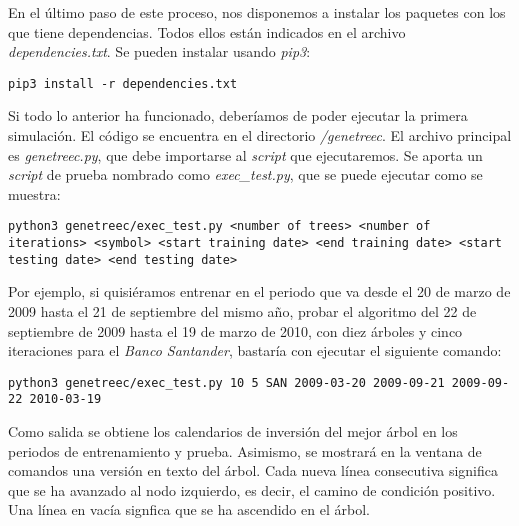 \begin{appendices}
En el \'ultimo paso de este proceso, nos disponemos a instalar los paquetes con los que tiene dependencias. Todos ellos est\'an indicados en el archivo \textit{dependencies.txt}. Se pueden instalar usando \textit{pip3}:

\begin{lstlisting}[basicstyle=\small]
pip3 install -r dependencies.txt
\end{lstlisting}

Si todo lo anterior ha funcionado, deber\'iamos de poder ejecutar la primera simulaci\'on. El c\'odigo se encuentra en el directorio \textit{/genetreec}. El archivo principal es \textit{genetreec.py}, que debe importarse al \textit{script} que ejecutaremos. Se aporta un \textit{script} de prueba nombrado como \textit{exec\_test.py}, que se puede ejecutar como se muestra:

\begin{lstlisting}[basicstyle=\small]
python3 genetreec/exec_test.py <number of trees> <number of iterations> <symbol> <start training date> <end training date> <start testing date> <end testing date>
\end{lstlisting}

Por ejemplo, si quisi\'eramos entrenar en el periodo que va desde el 20 de marzo de 2009 hasta el 21 de septiembre del mismo a\~no, probar el algoritmo del 22 de septiembre de 2009 hasta el 19 de marzo de 2010, con diez \'arboles y cinco iteraciones para el \textit{Banco Santander}, bastar\'ia con ejecutar el siguiente comando:

\begin{lstlisting}[basicstyle=\small]
python3 genetreec/exec_test.py 10 5 SAN 2009-03-20 2009-09-21 2009-09-22 2010-03-19
\end{lstlisting}

Como salida se obtiene los calendarios de inversi\'on del mejor \'arbol en los periodos de entrenamiento y prueba. Asimismo, se mostrar\'a en la ventana de comandos una versi\'on en texto del \'arbol. Cada nueva l\'inea consecutiva significa que se ha avanzado al nodo izquierdo, es decir, el camino de condici\'on positivo. Una l\'inea en vac\'ia signfica que se ha ascendido en el \'arbol.

\end{appendices}

